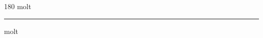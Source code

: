
\begin{frame}
\begin{center}
\begin{turn}{180}
{\fontsize{2.5cm}{1em}\selectfont molt}
\end{turn}
\vspace{1em}\par  
\hrule
\vspace{1em}\par  
{\fontsize{2.5cm}{1em}\selectfont molt}
\end{center}
\end{frame}

